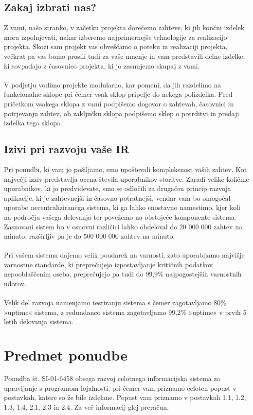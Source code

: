 \documentclass[12pt]{report}
\begin{document}
\section{Zakaj izbrati nas?}
Z vami, našo stranko, v začetku projekta dorečemo zahteve, ki jih končni izdelek mora izpolnjevati, nakar izberemo najprimernejše tehnologije za realizacijo projekta. Skozi sam projekt vas obveščamo o poteku in realizaciji projekta, večkrat pa vas bomo prosili tudi za vaše mnenje in vam predstavili delne izdelke, ki sovpadajo z časovnico projekta, ki jo zasnujemo skupaj z vami.\\\\
V podjetju vodimo projekte modularno, kar pomeni, da jih razdelimo na funkcionalne sklope pri čemer vsak sklop pripelje do nekega polizdelka. Pred pričetkom vsakega sklopa z vami podpišemo dogovor o zahtevah, časovnici in potrjevanju zahtev, ob zaključku sklopa podpišemo sklep o potrditvi in predaji izdelka tega sklopa.

\section{Izivi pri razvoju vaše IR}
Pri ponudbi, ki vam jo pošiljamo, smo upoštevali kompleksnost vaših zahtev. Kot največji izziv predstavlja ocena števila uporabnikov storitve. Zaradi velike količine uporabnikov, ki jo predvidevate, smo se odločili za drugačen princip razvoja aplikacije, ki je zahtevnejši in časovno potratnejši, vendar vam bo omogočal uporabo necentraliziranega sistema, ki ga lahko enostavno namestimo, kjer koli na področju vašega delovanja ter povežemo na obstoječe komponente sistema. Zasnovani sistem bo v osnovni različici lahko obdeloval do 20 000 000 zahtev na minuto, razširljiv pa je do 500 000 000 zahtev na minuto.\\\\
Pri vašem sistemu dajemo velik poudarek na varnosti, zato uporabljamo najvišje varnostne standarde, ki preprečujejo izpostavljanje kritičnih podatkov nepooblaščenim oseba, preprečujejo pa tudi do 99,9\% najpogostejših varnostnih udorov. \\\\
Velik del razvoja namenjamo testiranju sistema s čemer zagotavljamo 80\% »uptime« sistema, z redundanco sistema zagotavljamo 99,2\% »uptime« v prvih 5 letih delovanja sistema.

\pagebreak
\chapter{Predmet ponudbe}
Ponudba št. SI-01-6458 obsega razvoj celotnega informacijska sistema za upravljanje s programom lojalnosti, pri čemer vam priznamo celoten popust v postavkah, katere so že bile izdelane. Popust vam priznamo v postavkah 1.1, 1.2, 1.3, 1.4, 2.1, 2.3 in 2.4. Za več informacij glej preračun.
\end{document}

